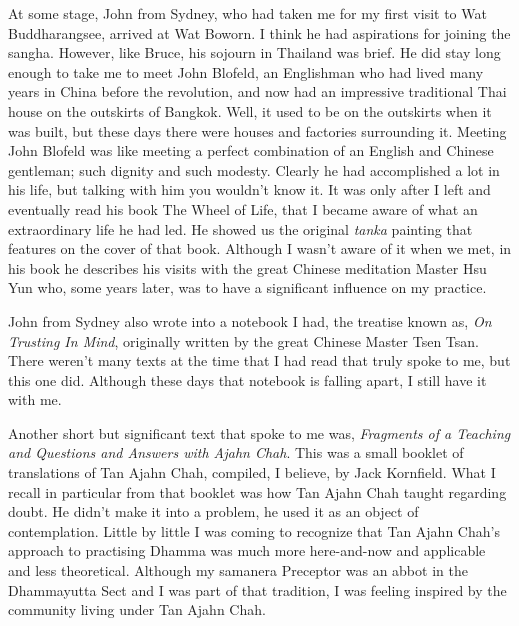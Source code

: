At some stage, John from Sydney, who had taken me for my first visit to
Wat Buddharangsee, arrived at Wat Boworn. I think he had aspirations for
joining the sangha. However, like Bruce, his sojourn in Thailand was
brief. He did stay long enough to take me to meet John Blofeld, an
Englishman who had lived many years in China before the revolution, and
now had an impressive traditional Thai house on the outskirts of
Bangkok. Well, it used to be on the outskirts when it was built, but
these days there were houses and factories surrounding it. Meeting John
Blofeld was like meeting a perfect combination of an English and Chinese
gentleman; such dignity and such modesty. Clearly he had accomplished a
lot in his life, but talking with him you wouldn't know it. It was only
after I left and eventually read his book The Wheel of Life\cite{wheel},
that I became aware of what an extraordinary
life he had led. He showed us the original \emph{tanka} painting that
features on the cover of that book. Although I wasn't aware of it when
we met, in his book he describes his visits with the great Chinese meditation
Master Hsu Yun\cite{hsu-yun} who, some years later,
was to have a significant influence on my practice.

John from Sydney also wrote into a notebook I had, the treatise known
as, \emph{On Trusting In Mind}, originally written by the great Chinese
Master Tsen Tsan. There weren't many texts at the time that I had read
that truly spoke to me, but this one did. Although these days that
notebook is falling apart, I still have it with me.

Another short but significant text that spoke to me was,
\emph{Fragments of a Teaching and Questions and Answers with Ajahn Chah}\cite{collected}.
This was a small booklet of translations of Tan Ajahn
Chah, compiled, I believe, by Jack Kornfield. What I recall in
particular from that booklet was how Tan Ajahn Chah taught regarding
doubt. He didn't make it into a problem, he used it as an object of
contemplation. Little by little I was coming to recognize that Tan Ajahn
Chah's approach to practising Dhamma was much more here-and-now and
applicable and less theoretical. Although my samanera Preceptor was an
abbot in the Dhammayutta Sect and I was part of that tradition, I was
feeling inspired by the community living under Tan Ajahn Chah.

